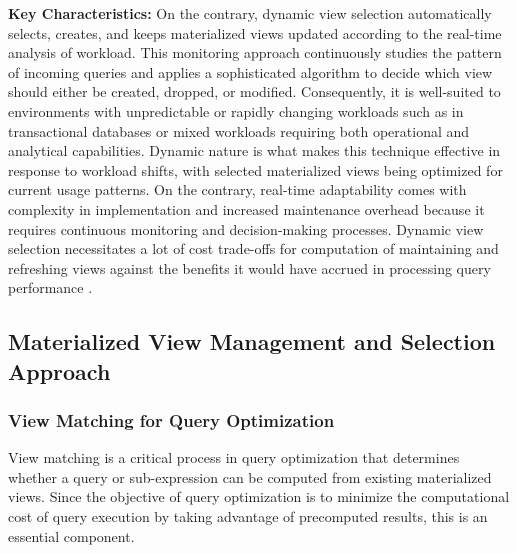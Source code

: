 \begin{enumerate}
    \textbf{Key Characteristics:} On the contrary, dynamic view selection automatically selects, creates, and keeps materialized views updated according to the real-time analysis of workload. This monitoring approach continuously studies the pattern of incoming queries and applies a sophisticated algorithm to decide which view should either be created, dropped, or modified. Consequently, it is well-suited to environments with unpredictable or rapidly changing workloads such as in transactional databases or mixed workloads requiring both operational and analytical capabilities. Dynamic nature is what makes this technique effective in response to workload shifts, with selected materialized views being optimized for current usage patterns. On the contrary, real-time adaptability comes with complexity in implementation and increased maintenance overhead because it requires continuous monitoring and decision-making processes. Dynamic view selection necessitates a lot of cost trade-offs for computation of maintaining and refreshing views against the benefits it would have accrued in processing query performance \cite{lohman2000selftuning,mamoulis2012survey,gupta2002selftuning}.
\end{enumerate}

\subsection{ Materialized View Management and Selection Approach}
\subsubsection{View Matching for Query Optimization }

View matching is a critical process in query optimization that determines whether a query or sub-expression can be computed from existing materialized views. Since the objective of query optimization is to minimize the computational cost of query execution by taking advantage of precomputed results, this is an essential component.\vspace{.4cm}


